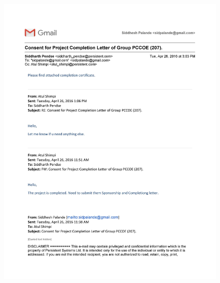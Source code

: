 \documentclass[oneside,a4paper,12pt]{report}
\begin{document}
{   \setlength{\parindent}{11mm} }
\begin{center}
	\begin{figure}[!htbp]
		\centering
		\includegraphics[width=\textwidth]{completion-letter-1}
	\end{figure}
\end{center}
\end{document}
